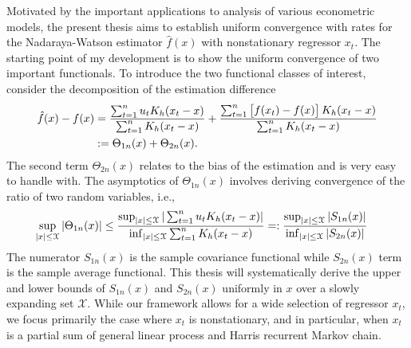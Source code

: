 

Motivated by the important applications to analysis of various econometric models, the present thesis aims to establish uniform convergence with rates for the Nadaraya-Watson estimator $\hat{f}(x)$ with nonstationary regressor $x_t$. The starting point of my development is to show the uniform convergence of two important functionals. To introduce the two functional classes of interest, consider the decomposition of the estimation difference
\begin{align}
	\hat{f}(x)-f(x) &= \frac{\sum_{t=1}^{n}u_{t}K_{h}(x_{t}-x)}{ \sum_{t=1}^{n}K_{h}(x_{t}-x)}+\frac{\sum_{t=1}^{n}\big[f(x_{t})-f(x)\big] \,K_{h}(x_{t}-x)}{\sum_{t=1}^{n}K_{h}(x_{t}-x)} \nonumber\\
&:= \Theta_{1n}(x)+\Theta_{2n}(x).\nonumber
\end{align}
The second term $\Theta_{2n}(x)$ relates to the bias of the estimation and is very easy to handle with. The asymptotics of $\Theta_{1n}(x)$ involves deriving convergence of the ratio of two random variables, i.e.,
\begin{align}
 \sup_{|x| \le \mathcal{X}} |\Theta_{1n}(x)| &\le \frac{\sup_{|x| \le \mathcal{X}}|\sum_{t=1}^{n}u_{t}K_h(x_{t}-x)|}{\inf_{|x| \le \mathcal{X}}\sum_{t=1}^{n}K_h(x_{t}-x)}  =: \frac{\sup_{|x| \le \mathcal{X}}|S_{1n}(x)|}{\inf_{|x| \le \mathcal{X}}|S_{2n}(x)|} \nonumber
\end{align}
The numerator $S_{1n}(x)$ is the sample covariance functional while $S_{2n}(x)$ term is the sample average functional. This thesis will systematically derive the upper and lower bounds of $S_{1n}(x)$ and $S_{2n}(x)$ uniformly in $x$ over a slowly expanding set $\mathcal{X}$. While our framework allows for a wide selection of regressor $x_t$, we focus primarily the case where $x_t$ is nonstationary, and in particular, when $x_t$ is a partial sum of general linear process and Harris recurrent Markov chain.

